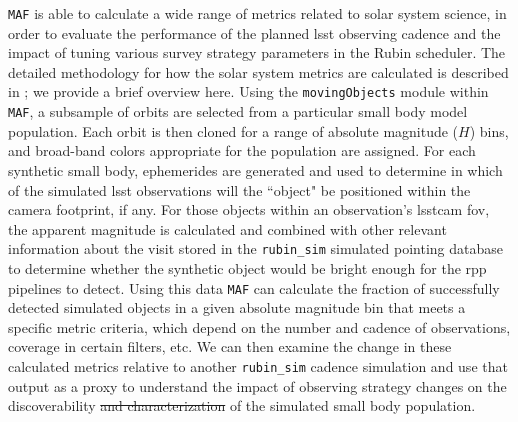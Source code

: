 \documentclass[preprintm,linenumbers]{aastex631}
\newcommand{\rubinsim}{\texttt{rubin\_sim}\xspace}
\newcommand{\maf}{\texttt{MAF}\xspace}
\begin{document}
\maf is able to calculate a wide range of metrics related to solar system science, in order to evaluate the performance of the planned \gls*{lsst} observing cadence and the impact of tuning various survey strategy parameters in the Rubin scheduler. The detailed methodology for how the solar system metrics are calculated is described in \cite{schwambTuningLegacySurvey2023}; we provide a brief overview here. 
Using the \texttt{movingObjects} module within \maf, a subsample of orbits are selected from a particular small body model population. 
Each orbit is then cloned for a range of absolute magnitude ($H$) bins, and broad-band colors appropriate for the population are assigned. 
For each synthetic small body, ephemerides are generated and used to determine in which of the simulated \gls*{lsst} observations will the ``object" be positioned within the camera footprint, if any. 
For those objects within an observation's \gls*{lsstcam} \gls*{fov}, the apparent magnitude is calculated and combined with other relevant information about the visit stored in the \rubinsim simulated pointing database to determine whether the synthetic object would be bright enough for the \gls*{rpp} pipelines to detect. 
Using this data \maf can calculate the fraction of successfully detected simulated objects in a given absolute magnitude bin that meets a specific metric criteria, which depend on the number and cadence of observations, coverage in certain filters, etc. 
We can then examine the change in these calculated metrics relative to another \rubinsim cadence simulation and use that output as a proxy to understand the impact of observing strategy changes on the discoverability \sout{and characterization} of the simulated small body population.  
\end{document}
